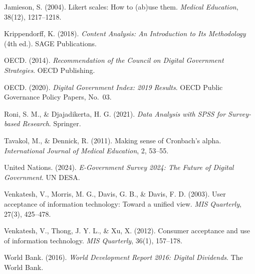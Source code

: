 \documentclass[12pt,a4paper]{article}
\begin{document}
\begin{enumerate}[leftmargin=1.5em, itemsep=4pt, label={[\arabic*]}]
    \item Jamieson, S. (2004). Likert scales: How to (ab)use them. \textit{Medical Education}, 38(12), 1217--1218.
    \item Krippendorff, K. (2018). \textit{Content Analysis: An Introduction to Its Methodology} (4th ed.). SAGE Publications.
    \item OECD. (2014). \textit{Recommendation of the Council on Digital Government Strategies}. OECD Publishing.
    \item OECD. (2020). \textit{Digital Government Index: 2019 Results}. OECD Public Governance Policy Papers, No.~03.
    \item Roni, S. M., \& Djajadikerta, H. G. (2021). \textit{Data Analysis with SPSS for Survey-based Research}. Springer.
    \item Tavakol, M., \& Dennick, R. (2011). Making sense of Cronbach's alpha. \textit{International Journal of Medical Education}, 2, 53--55.
    \item United Nations. (2024). \textit{E-Government Survey 2024: The Future of Digital Government}. UN DESA.
    \item Venkatesh, V., Morris, M. G., Davis, G. B., \& Davis, F. D. (2003). User acceptance of information technology: Toward a unified view. \textit{MIS Quarterly}, 27(3), 425--478.
    \item Venkatesh, V., Thong, J. Y. L., \& Xu, X. (2012). Consumer acceptance and use of information technology. \textit{MIS Quarterly}, 36(1), 157--178.
    \item World Bank. (2016). \textit{World Development Report 2016: Digital Dividends}. The World Bank.
\end{enumerate}
\end{document}
